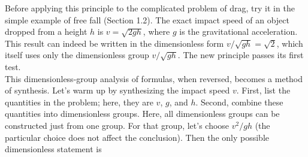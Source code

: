 \documentclass[a4paper]{book}
\begin{document}
\noindent Before applying this principle to the complicated problem of drag, try it in the simple example of free fall (Section 1.2). The exact impact speed of an object dropped from a height $h$ is $v = \sqrt{2gh}$, where $g$ is the gravitational acceleration. This result can indeed be written in the dimensionless form $v/\sqrt{gh} = \sqrt{2}$, which itself uses only the dimensionless group $v/\sqrt{gh}$. The new principle passes its first test.\\

\noindent This dimensionless-group analysis of formulas, when reversed, becomes a method of synthesis. Let’s warm up by synthesizing the impact speed $v$. First, list the quantities in the problem; here, they are $v$, $g$, and $h$. Second, combine these quantities into dimensionless groups. Here, all dimensionless groups can be constructed just from one group. For that group, let’s choose $v^2/gh$ (the particular choice does not affect the conclusion). Then the only possible dimension\-less statement is
\end{document}

